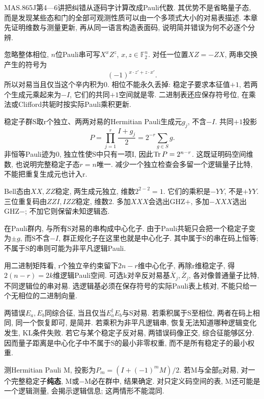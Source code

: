 MAS.865J第4—6讲把纠错从逐码字计算改成Pauli代数. 其优势不是省略量子态, 而是发现某些态和门的全部可观测性质可以由一个多项式大小的对易表描述. 本章先证明维数与测量更新, 再从同一语言构造表面码, 说明简并错误为何不必逐个分辨.

忽略整体相位, $n$位Pauli串可写$X^xZ^z$, $x,z\in\mathbb F_2^n$. 对任一位置$XZ=-ZX$, 两串交换产生的符号为
\[(-1)^{x\cdot z'+z\cdot x'}.\]
所以对易当且仅当这个辛内积为0. 相位不能永久丢掉: 稳定子要求本征值$+1$, 若两个生成元乘起来为$-I$, 它们的共同$+1$空间就是零. 二进制表还应保存符号位, 在乘法或Clifford共轭时按实际Pauli乘积更新.

稳定子群S取r个独立、两两对易的Hermitian Pauli生成元$g_j$, 不含$-I$. 共同$+1$投影
\[P=\prod_{j=1}^r\frac{I+g_j}2=2^{-r}\sum_{g\in S}g.\]
非恒等Pauli迹为0, 独立性使S中只有一项I, 因此$\operatorname{Tr} P=2^{n-r}$. 这既证明码空间维数, 也说明完整稳定子态$r=n$唯一. 减少一个独立检查会多留一个逻辑量子比特, 不能把重复生成元也计入r.

\begin{example}Bell态由$XX,ZZ$稳定, 两生成元独立, 维数$2^{2-2}=1$. 它们的乘积是$-YY$, 不是$+YY$. 三位重复码由$ZZI,IZZ$稳定, 维数2. 多加$XXX$会选出GHZ$+$, 多加$-XXX$选出GHZ$-$; 不加它则保留未知逻辑态.\end{example}

在Pauli群内, 与所有S对易的串构成中心化子. 由于Pauli共轭只会把一个稳定子变为$\pm g$, 而S不含$-I$, 群正规化子在这里也就是中心化子. 其中属于S的串在码上恒等; 不属于S的串则可能为非平凡逻辑Pauli.

用二进制矩阵看, r个独立辛约束留下$2n-r$维中心化子, 再除r维稳定子, 得$2(n-r)=2k$维逻辑Pauli空间. 可选k对辛反对易基$\overline X_j,\overline Z_j$, 各对像普通量子比特, 不同逻辑位的串对易. 选逻辑基必须在保存符号的实际Pauli表上核对, 不能只给一个无相位的二进制向量.

两错误$E_a,E_b$同综合征, 当且仅当$E_a^\dagger E_b$与S对易. 若乘积属于S至相位, 两者在码上相同, 同一个恢复即可, 是简并. 若乘积为非平凡逻辑串, 恢复无法知道哪种逻辑变化发生, KL条件失败. 若它与某个稳定子反对易, 两错误码像正交, 综合征能够区分. 因而量子距离是中心化子中不属于S的最小非零权重, 而不是所有稳定子的最小权重.

测Hermitian Pauli M, 投影为$P_m=(I+(-1)^mM)/2$. 若M与全部g对易, 对一个完整稳定子\textbf{纯态}, M或−M必在群中, 结果确定. 对只定义码空间的表, M还可能是一个逻辑测量, 会揭示逻辑信息; 这两情形不能混同.

